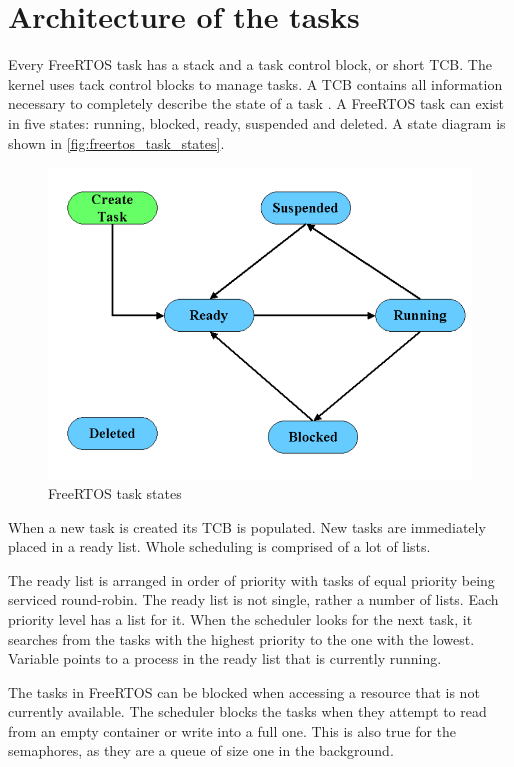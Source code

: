 \section{Architecture of the tasks}
 

Every FreeRTOS task has a stack and a task control block, or short TCB. The kernel uses tack control blocks to manage tasks. A TCB contains all information necessary to completely describe the state of a task  \citep{freertos_inner_workings}. A FreeRTOS task can exist in five states: running, blocked, ready, suspended and deleted. A state diagram is shown in \autoref{fig:freertos_task_states}.

\begin{figure}[H]

      \centering
      \includegraphics[width=0.7\linewidth]{images/freertos_task_states.png}
      \caption{FreeRTOS task states\citep[p~10]{freertos_inner_workings}}
      \label{fig:freertos_task_states}
    
\end{figure}

When a new task is created its TCB is populated. New tasks are immediately placed in a ready list. Whole scheduling is comprised of a lot of lists.

The ready list is arranged in order of priority with tasks of equal priority being serviced round-robin. The ready list is not single, rather a  number of lists. Each priority level has a list for it. When the scheduler looks for the next task, it searches from the tasks with the highest priority to the one with the lowest. Variable  points to a process in the ready list that is currently running.

The tasks in FreeRTOS can be blocked when accessing a resource that is not currently available. The scheduler blocks the tasks when they attempt to read from an empty container or write into a full one. This is also true for the semaphores, as they are a queue of size one in the background.

